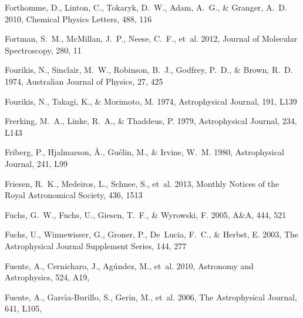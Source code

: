 \documentclass[twocolumn]{aastex631}
\begin{document}
\begin{thebibliography}{}
Forthomme, D., Linton, C., Tokaryk, D.~W., Adam, A.~G., \& Granger, A.~D. 2010,
  Chemical Physics Letters, 488, 116

Fortman, S.~M., McMillan, J.~P., Neese, C.~F., {et~al.} 2012, Journal of
  Molecular Spectroscopy, 280, 11

Fourikis, N., Sinclair, M.~W., Robinson, B.~J., Godfrey, P.~D., \& Brown, R.~D.
  1974{}, Australian Journal of Physics, 27, 425

Fourikis, N., Takagi, K., \& Morimoto, M. 1974{}, Astrophysical
  Journal, 191, L139

Frerking, M.~A., Linke, R.~A., \& Thaddeus, P. 1979, Astrophysical Journal,
  234, L143

Friberg, P., Hjalmarson, {\AA}., Gu{\'e}lin, M., \& Irvine, W.~M. 1980,
  Astrophysical Journal, 241, L99

Friesen, R.~K., Medeiros, L., Schnee, S., {et~al.} 2013, Monthly Notices of the
  Royal Astronomical Society, 436, 1513

Fuchs, G.~W., Fuchs, U., Giesen, T.~F., \& Wyrowski, F. 2005, A{\&}A, 444, 521

Fuchs, U., Winnewisser, G., Groner, P., De~Lucia, F.~C., \& Herbst, E. 2003,
  The Astrophysical Journal Supplement Series, 144, 277

{Fuente}, A., {Cernicharo}, J., {Ag{\'u}ndez}, M., {et~al.} 2010, Astronomy and
  Astrophysics, 524, A19, 

{Fuente}, A., {Garc{\'\i}a-Burillo}, S., {Gerin}, M., {et~al.} 2006, The
  Astrophysical Journal, 641, L105, 


\end{thebibliography}
\end{document}
